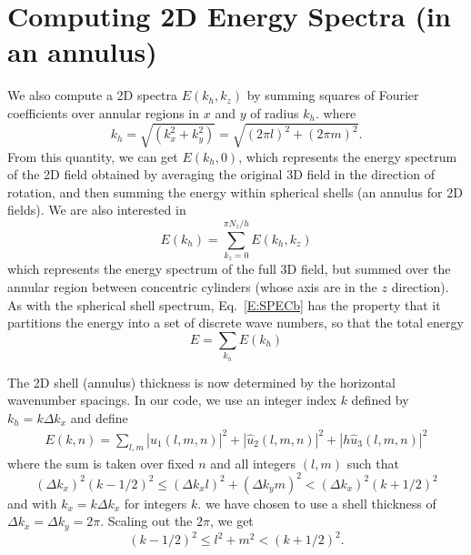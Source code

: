 \documentclass[12pt]{article}
\begin{document}
\section{Computing 2D Energy Spectra (in an annulus)}
We also compute a 2D spectra $E(k_h,k_z)$ by summing squares of Fourier
coefficients over annular regions in 
$x$ and $y$ of radius $k_h$.  
where 
\[
k_h = \sqrt{(k_x^2 + k_y^2)} = \sqrt{(2\pi l)^2 + (2\pi m)^2}. 
\]
From this quantity, we can get $E(k_h,0)$, which 
represents the energy spectrum of the 2D field
obtained by averaging the original 3D field  in the direction of rotation,
and then summing the energy within spherical shells (an annulus for 2D fields).
We are also interested in 
\begin{equation}
E(k_h) = \sum_{k_z=0}^{\pi N_z/h} E(k_h,k_z) 
\label{E:SPECb}
\end{equation}
which represents 
the energy spectrum of the full 3D field, but summed over
the annular region between concentric cylinders
(whose axis are in the $z$ direction).  As with the spherical
shell spectrum, Eq.~\ref{E:SPECb} has the property that
it partitions the energy into a set of discrete wave numbers, so
that the total energy 
\[
E = \sum_{k_h} E(k_h)
\]


The 2D shell (annulus) thickness is now
determined by the horizontal wavenumber spacings. In our code,
we use an integer index $k$ defined by $k_h = k \Delta k_x$ and
define
\begin{eqnarray*}
E(k,n) = \sum_{l,m}  |  {\hat u_1}(l,m,n) |^2 +
 |  {\hat u_2}(l,m,n) |^2 + 
 |  h {\hat u_3}(l,m,n) |^2
\end{eqnarray*}
where the sum is taken over fixed $n$ and all integers $(l,m)$ such that 
\[
(\Delta k_x)^2 (k-1/2)^2 \le (\Delta k_x l)^2 + (\Delta k_y m)^2  <  (\Delta k_x)^2 (k+1/2)^2 
\]
and with $k_x=k \Delta k_x$ for integers $k$.  
we have chosen to use a shell thickness of $\Delta k_x = \Delta
k_y = 2\pi$. Scaling out the $2\pi$, we get
\[
(k-1/2)^2 \le l^2 + m^2 < (k+1/2)^2.
\]  
\end{document}
